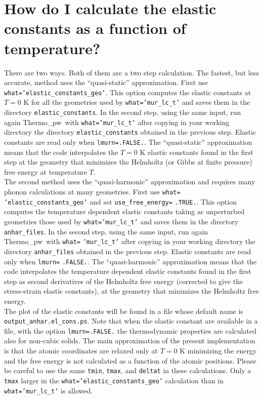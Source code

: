 \documentclass[12pt,a4paper,twoside]{report}
\def\thermo{{\sc Thermo}\_{\sc pw}}
\begin{document}
\newpage
{\color{coral}\section{How do I calculate the elastic constants 
as a function of temperature?}}
\color{black}
There are two ways. Both of them are a two step calculation. 
The fastest, but less accurate, method uses the ``quasi-static'' approximation.
First use 
\texttt{what='elastic\_constants\_geo'}. This option computes the elastic
constants at $T=0$ K for all the geometries used by 
\texttt{what='mur\_lc\_t'} and
saves them in the directory \texttt{elastic\_constants}.  
In the second step, using the same input, run again 
\thermo\ with \texttt{what='mur\_lc\_t'} after copying in your
working directory the directory \texttt{elastic\_constants} obtained 
in the previous step. Elastic constants are read only when
\texttt{lmurn=.FALSE.}.
The ``quasi-static'' approximation means that the code interpolates
the $T=0$ K elastic constants found in the first step at the geometry that
minimizes the Helmholtz (or Gibbs at finite pressure) free energy at
temperature $T$. \\
The second method uses the ``quasi-harmonic'' approximation and
requires many phonon calculations at many geometries.
First use \texttt{what=} \texttt{'elastic\_constants\_geo'} and set
\texttt{use\_free\_energy=} \texttt{.TRUE.}. This option computes the 
temperature dependent elastic constants taking as unperturbed geometries 
those used by \texttt{what='mur\_lc\_t'} and saves them in the directory 
\texttt{anhar\_files}.  
In the second step, using the same input, run again 
\thermo\ with \texttt{what=} \texttt{'mur\_lc\_t'} after 
copying in your
working directory the directory \texttt{anhar\_files} obtained 
in the previous step. Elastic constants are read only when
\texttt{lmurn=} \texttt{.FALSE.}. 
The ``quasi-harmonic'' approximation means that the code interpolates
the temperature dependent elastic constants found in the first step as
second derivatives of the Helmholtz free energy (corrected to give the
stress-strain elastic constants), at the geometry that
minimizes the Helmholtz free energy. \\
The plot of the elastic constants will be found in a file whose default
name is \texttt{output\_anhar.el\_cons.ps}.
Note that when the elastic constant are available in a file, 
with the option \texttt{lmurn=.FALSE.} the thermodynamic properties 
are calculated also for non-cubic solids.
The main approximation of the present implementation is that the atomic 
coordinates are relaxed only at $T=0$ K minimizing the energy and
the free energy is 
not calculated as a function of the atomic positions.
Please be careful to use the same \texttt{tmin}, \texttt{tmax}, and
\texttt{deltat} in these calculations. Only a \texttt{tmax} larger in the
\texttt{what='elastic\_constants\_geo'} calculation than in 
\texttt{what='mur\_lc\_t'} is allowed.
\end{document}
